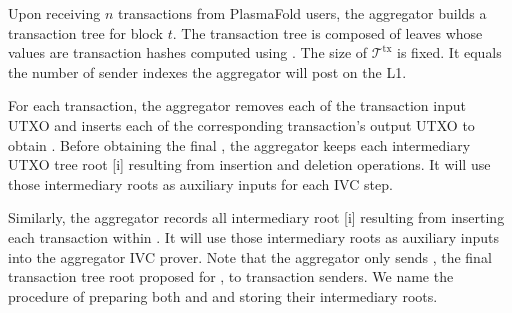 \documentclass[../main.tex]{subfiles}
\begin{document}
Upon receiving $n$ transactions from PlasmaFold users, the aggregator builds a transaction tree  for block $t$. The transaction tree is composed of leaves whose values are  transaction hashes computed using \txcrh. The size of $\mathcal{T}^{\text{tx}}$ is fixed. It equals the number of sender indexes the aggregator will post on the L1.

For each transaction, the aggregator removes each of the transaction input UTXO and inserts each of the corresponding transaction's output UTXO to obtain . Before obtaining the final , the aggregator keeps each intermediary UTXO tree root [i] resulting from insertion and deletion operations. It will use those intermediary roots as auxiliary inputs for each IVC step. 

Similarly, the aggregator records all intermediary root [i] resulting from inserting each transaction within . It will use those intermediary roots as auxiliary inputs into the aggregator IVC prover. Note that the aggregator only sends , the final transaction tree root proposed for , to transaction senders. We name \preparetrees the procedure of preparing both  and  and storing their intermediary roots.
\end{document}
